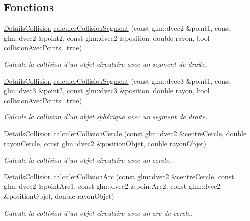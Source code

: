 \subsection*{Fonctions}
\begin{DoxyCompactItemize}
\item 
\hyperlink{classaidecollision_1_1_details_collision}{Details\-Collision} \hyperlink{namespaceaidecollision_a778ea767a466a333017247d9cb63d1e4}{calculer\-Collision\-Segment} (const glm\-::dvec2 \&point1, const glm\-::dvec2 \&point2, const glm\-::dvec2 \&position, double rayon, bool collision\-Avec\-Points=true)
\begin{DoxyCompactList}\small\item\em Calcule la collision d'un objet circulaire avec un segment de droite. \end{DoxyCompactList}\item 
\hyperlink{classaidecollision_1_1_details_collision}{Details\-Collision} \hyperlink{namespaceaidecollision_a21b6909881ded08e749cd878bb2f860f}{calculer\-Collision\-Segment} (const glm\-::dvec3 \&point1, const glm\-::dvec3 \&point2, const glm\-::dvec3 \&position, double rayon, bool collision\-Avec\-Points=true)
\begin{DoxyCompactList}\small\item\em Calcule la collision d'un objet sphérique avec un segment de droite. \end{DoxyCompactList}\item 
\hyperlink{classaidecollision_1_1_details_collision}{Details\-Collision} \hyperlink{namespaceaidecollision_a38ff38a31eac6fa58d2ed35aedc4ed57}{calculer\-Collision\-Cercle} (const glm\-::dvec2 \&centre\-Cercle, double rayon\-Cercle, const glm\-::dvec2 \&position\-Objet, double rayon\-Objet)
\begin{DoxyCompactList}\small\item\em Calcule la collision d'un objet circulaire avec un cercle. \end{DoxyCompactList}\item 
\hyperlink{classaidecollision_1_1_details_collision}{Details\-Collision} \hyperlink{namespaceaidecollision_a3d5b4f5dcf2ccb0ea9fd08a947949a6d}{calculer\-Collision\-Arc} (const glm\-::dvec2 \&centre\-Cercle, const glm\-::dvec2 \&point\-Arc1, const glm\-::dvec2 \&point\-Arc2, const glm\-::dvec2 \&position\-Objet, double rayon\-Objet)
\begin{DoxyCompactList}\small\item\em Calcule la collision d'un objet circulaire avec un arc de cercle. \end{DoxyCompactList}\item 

\end{DoxyCompactItemize}
